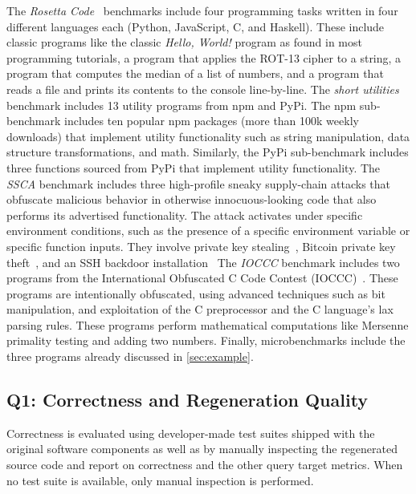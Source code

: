 \documentclass[nonacm,sigplan]{acmart}
\begin{document}
The \textit{Rosetta Code}~\cite{rosettacode} benchmarks include four programming tasks written in four different
languages each (Python, JavaScript, C, and Haskell). 
These include classic programs like
the classic \emph{Hello, World!} program as found in most programming tutorials,
a program that applies the ROT-13 cipher to a string,
a program that computes the median of a list of numbers,
and a program that reads a file and prints its contents to the console line-by-line.
The \textit{short utilities} benchmark includes 13 utility programs from npm and PyPi.
The npm sub-benchmark includes ten popular npm packages (more than 100k weekly downloads) that implement utility
functionality such as string manipulation, data structure transformations, and math.
Similarly, the PyPi sub-benchmark includes three functions sourced from PyPi that implement utility functionality.
The \textit{SSCA} benchmark includes three high-profile sneaky supply-chain attacks that obfuscate malicious behavior in otherwise innocuous-looking code that also performs its advertised functionality.
The attack activates under specific environment conditions, such as the presence of a specific environment variable or specific function inputs.
They involve private key stealing~\cite{ohm2020backstabber}, Bitcoin private key theft~\cite{ev:eurosec:2022}, and an SSH backdoor installation~\cite{copeland2019frightening}
The \textit{IOCCC} benchmark includes two programs from the International Obfuscated C Code Contest (IOCCC)~\cite{ioccc}.
These programs are intentionally obfuscated, using advanced techniques such as bit manipulation,
and exploitation of the C preprocessor and the C language's lax parsing rules.
These programs perform mathematical computations like Mersenne primality testing and adding two numbers.
Finally, microbenchmarks include the three programs already discussed in \cref{sec:example}.

\subsection{Q1: Correctness and Regeneration Quality}

Correctness is evaluated using developer-made test suites 
shipped with the original software components as well as by manually inspecting
the regenerated source code and report on correctness and the other query target metrics.
When no test suite is available, only manual inspection is performed.
\end{document}

